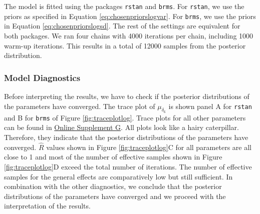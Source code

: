 \documentclass[
  english,
  doc,floatsintext]{apa6}
\begin{document}
The model is fitted using the packages \texttt{rstan} and \texttt{brms}. For \texttt{rstan}, we use the priors as specified in Equation \eqref{eq:chosenpriorslogvar}. For \texttt{brms}, we use the priors in Equation \eqref{eq:chosenpriorslogsd}. The rest of the settings are equivalent for both packages. We ran four chains with 4000 iterations per chain, including 1000 warm-up iterations. This results in a total of 12000 samples from the posterior distribution.

\hypertarget{model-diagnostics-1}{%
\subsubsection{Model Diagnostics}\label{model-diagnostics-1}}

Before interpreting the results, we have to check if the posterior distributions of the parameters have converged. The trace plot of \(\mu_{\delta_{6}}\) is shown panel A for \texttt{rstan} and B for \texttt{brms} of Figure \ref{fig:traceplotlog}. Trace plots for all other parameters can be found in \href{https://github.com/MyrtheV/Bayesian-Hierarchical-Modelling-An-Introduction-and-Reassessment/tree/main/G\%20-\%20Trace\%20Plots\%20}{Online Supplement G}. All plots look like a hairy caterpillar. Therefore, they indicate that the posterior distributions of the parameters have converged. \(\hat{R}\) values shown in Figure \ref{fig:traceplotlog}C for all parameters are all close to 1 and most of the number of effective samples shown in Figure \ref{fig:traceplotlog}D exceed the total number of iterations. The number of effective samples for the general effects are comparatively low but still sufficient. In combination with the other diagnostics, we conclude that the posterior distributions of the parameters have converged and we proceed with the interpretation of the results.
\end{document}

